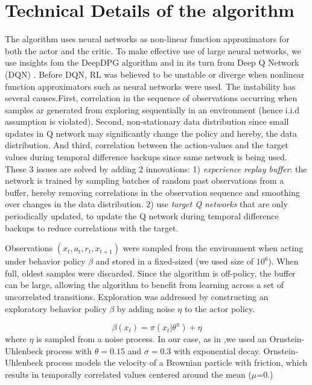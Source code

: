 \section{Technical Details of the algorithm}
The algorithm uses neural networks as non-linear function approximators for both the actor and the critic.
To make effective use of large neural networks, we use insights fom the DeepDPG algorithm \cite{Lillicrap2016} and in its turn
from Deep Q Network (DQN) \citep{Mnih2015}.
Before DQN, RL was believed to be unstable or diverge when nonlinear function approximators such as neural networks were used.
The instability has several causes.First, correlation in the sequence of observations occurring when
samples ar generated from exploring sequentially in an environment (hence i.i.d assumption is violated).
Second, non-stationary data distribution since small updates in Q network may significantly change the policy and hereby, the data distribution.
And third, correlation between the action-values and the target values during temporal difference backups since same network is being used.
These 3 issues are solved by adding 2 innovations: 1)  \textit{experience replay buffer}: the network is trained by sampling 
batches of random past observations from a buffer, hereby removing correlations in the observation sequence and smoothing over
changes in the data distribution.
2) use \textit{target Q networks} that are only periodically updated, to update the Q network during temporal difference backups to reduce
correlations with the target.

Observations $(x_t,a_t,r_t,x_{t+1})$ were sampled from the environment when acting under behavior policy $\beta$ and stored
in a fixed-sized (we used size of $10^6$). When full, oldest samples were discarded.
Since the algorithm is off-policy, the buffer can be large, allowing the algorithm to benefit from
learning across a set of uncorrelated transitions.
Exploration was addressed by constructing an exploratory behavior policy $\beta$ by adding noise $\eta$ to the actor policy.

\begin{equation}
    \beta(x_t)=\pi(x_t| \theta^\pi) + \eta
\end{equation}
where $\eta$ is sampled from a noise process. In our case, as in \citet{Lillicrap2016},we
used an Ornstein-Uhlenbeck process \citep{Uhlenbeck1930} with $\theta = 0.15$ and $\sigma=0.3$ with exponential decay.
Ornstein-Uhlenbeck process models the velocity of a Brownian particle with friction, which results in temporally correlated
values centered around the mean ($\mu$=0.) 

